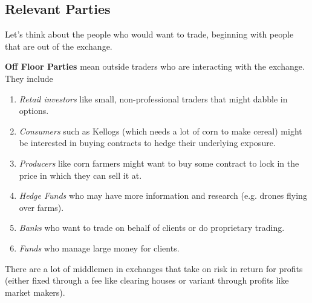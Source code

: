 \documentclass{article}
\begin{document}
  \subsection{Relevant Parties}

    Let's think about the people who would want to trade, beginning with people that are out of the exchange. 

    \begin{definition}
      \textbf{Off Floor Parties} mean outside traders who are interacting with the exchange. They include 
      \begin{enumerate}
        \item \textit{Retail investors} like small, non-professional traders that might dabble in options.  
        \item \textit{Consumers} such as Kellogs (which needs a lot of corn to make cereal) might be interested in buying contracts to hedge their underlying exposure. 
        \item \textit{Producers} like corn farmers might want to buy some contract to lock in the price in which they can sell it at. 
        \item \textit{Hedge Funds} who may have more information and research (e.g. drones flying over farms). 
        \item \textit{Banks} who want to trade on behalf of clients or do proprietary trading. 
        \item \textit{Funds} who manage large money for clients. 
      \end{enumerate}
    \end{definition}

    There are a lot of middlemen in exchanges that take on risk in return for profits (either fixed through a fee like clearing houses or variant through profits like market makers). 
\end{document}
